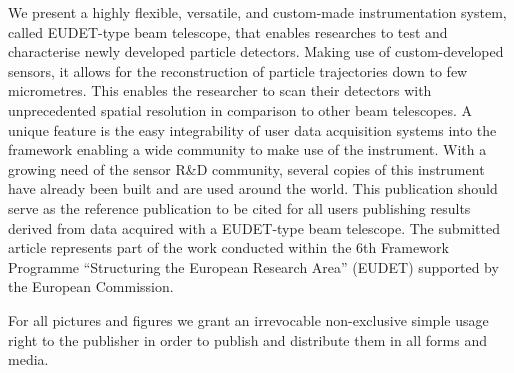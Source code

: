  


We present a highly flexible, versatile, and custom-made instrumentation system, called EUDET-type beam telescope, that enables researches to test and characterise newly developed particle detectors.
Making use of custom-developed sensors, it allows for the reconstruction of particle trajectories down to few micrometres. 
This enables the researcher to scan their detectors with unprecedented spatial resolution in comparison to other beam telescopes. 
A unique feature is the easy integrability of user data acquisition systems into the framework enabling a wide community to make use of the instrument. 
With a growing need of the sensor R\&D community, several copies of this instrument have already been built and are used around the world. 
This publication should serve as the reference publication to be cited for all users publishing results derived from data acquired with a EUDET-type beam telescope.
The submitted article represents part of the work conducted within the 6th Framework Programme “Structuring the European Research Area” (EUDET) supported by the European Commission. 

For all pictures and figures we grant an irrevocable non-exclusive simple usage right to the publisher in order to publish and distribute them in all forms and media.


% 
% 
% 
% 
% 
% 
